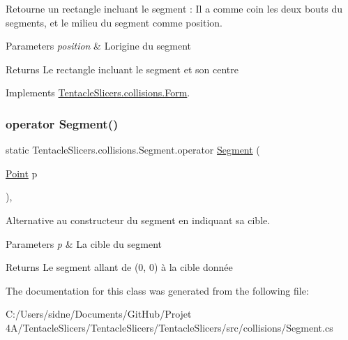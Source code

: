 Retourne un rectangle incluant le segment \+: Il a comme coin les deux bouts du segments, et le milieu du segment comme position. 


\begin{DoxyParams}{Parameters}
{\em position} & L\textquotesingle{}origine du segment \\
\hline
\end{DoxyParams}
\begin{DoxyReturn}{Returns}
Le rectangle incluant le segment et son centre 
\end{DoxyReturn}


Implements \hyperlink{class_tentacle_slicers_1_1collisions_1_1_form_a00c94b5a1e83d9db6aa3a4cab969fd2c}{Tentacle\+Slicers.\+collisions.\+Form}.

\mbox{\label{class_tentacle_slicers_1_1collisions_1_1_segment_afc2e42528b122bc5307209e10ef13689}} 
\subsubsection{\texorpdfstring{operator Segment()}{operator Segment()}}
{\footnotesize\ttfamily static Tentacle\+Slicers.\+collisions.\+Segment.\+operator \hyperlink{class_tentacle_slicers_1_1collisions_1_1_segment}{Segment} (\begin{DoxyParamCaption}\item[{\hyperlink{class_tentacle_slicers_1_1general_1_1_point}{Point}}]{p }\end{DoxyParamCaption})\hspace{0.3cm}{\ttfamily [explicit]}, {\ttfamily [static]}}



Alternative au constructeur du segment en indiquant sa cible. 


\begin{DoxyParams}{Parameters}
{\em p} & La cible du segment \\
\hline
\end{DoxyParams}
\begin{DoxyReturn}{Returns}
Le segment allant de (0, 0) à la cible donnée 
\end{DoxyReturn}


The documentation for this class was generated from the following file\+:\begin{DoxyCompactItemize}
\item 
C\+:/\+Users/sidne/\+Documents/\+Git\+Hub/\+Projet 4\+A/\+Tentacle\+Slicers/\+Tentacle\+Slicers/\+Tentacle\+Slicers/src/collisions/Segment.\+cs\end{DoxyCompactItemize}
